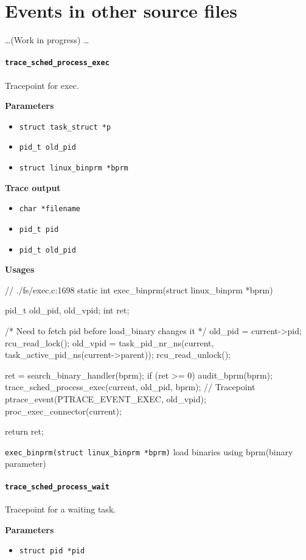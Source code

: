 \section{Events in other source files}
\dots (Work in progress) \dots
\paragraph{\texttt{trace\_sched\_process\_exec}}
Tracepoint for exec.

\textbf{Parameters}
\begin{itemize}
    \item \verb|struct task_struct *p|
    \item \verb|pid_t old_pid|
    \item \verb|struct linux_binprm *bprm|
\end{itemize}

\textbf{Trace output}
\begin{itemize}
    \item \verb|char *filename| %
    \item \verb|pid_t pid|
    \item \verb|pid_t old_pid|
\end{itemize}

\textbf{Usages}
\begin{code}
// ./fs/exec.c:1698
static int exec_binprm(struct linux_binprm *bprm){
	pid_t old_pid, old_vpid;
	int ret;

	/* Need to fetch pid before load_binary changes it */
	old_pid = current->pid;
	rcu_read_lock();
	old_vpid = task_pid_nr_ns(current, task_active_pid_ns(current->parent));
	rcu_read_unlock();

	ret = search_binary_handler(bprm);
	if (ret >= 0) {
		audit_bprm(bprm);
		trace_sched_process_exec(current, old_pid, bprm); // Tracepoint
		ptrace_event(PTRACE_EVENT_EXEC, old_vpid);
		proc_exec_connector(current);
	}

	return ret;
}
\end{code}
\verb|exec_binprm(struct linux_binprm *bprm)|
load binaries using bprm(binary parameter)
  
\paragraph{\texttt{trace\_sched\_process\_wait}}
Tracepoint for a waiting task.

\textbf{Parameters}
\begin{itemize}
    \item \verb|struct pid *pid|
\end{itemize}

